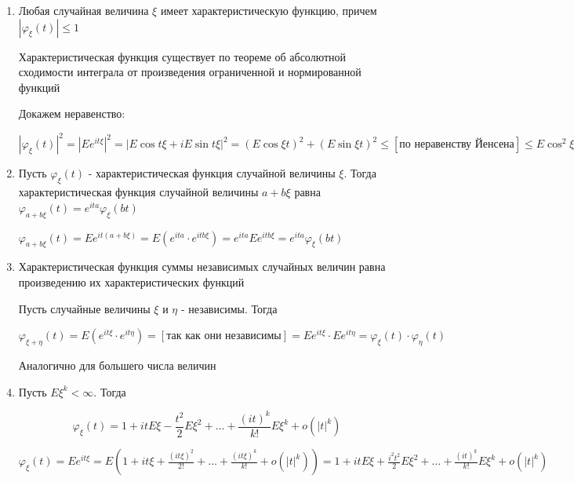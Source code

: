 \documentclass[12pt]{article}
\begin{document}
\begin{enumerate}
    \item Любая случайная величина $\xi$ имеет характеристическую функцию, причем $|\varphi_\xi(t)| \leq 1$

    \begin{MyProof}
        Характеристическая функция существует по теореме об абсолютной сходимости интеграла от произведения ограниченной и 
        нормированной функций

        Докажем неравенство:

        $|\varphi_\xi(t)|^2 = |Ee^{it\xi}|^2 = |E\cos t\xi + iE\sin t\xi|^2 = (E\cos\xi t)^2 + (E \sin\xi t)^2 \leq [\text{по неравенству Йенсена}] \leq
        E\cos^2 \xi t + E\sin^2 \xi t = E(\cos^2 \xi t + \sin^2 \xi t) = E 1 = 1$
    \end{MyProof}

    \item Пусть $\varphi_\xi(t)$ - характеристическая функция случайной величины $\xi$. Тогда характеристическая функция
    случайной величины $a + b\xi$ равна $\varphi_{a + b\xi}(t) = e^{ita} \varphi_{\xi}(bt)$

    \begin{MyProof}
        $\varphi_{a + b\xi}(t) = Ee^{it(a + b\xi)} = E(e^{ita} \cdot e^{itb\xi}) = e^{ita}Ee^{itb\xi} = e^{ita} \varphi_{\xi}(bt)$
    \end{MyProof}

    \item Характеристическая функция суммы независимых случайных величин равна произведению их характеристических функций

    \begin{MyProof}
        Пусть случайные величины $\xi$ и $\eta$ - независимы. Тогда 

        $\varphi_{\xi + \eta}(t) = E(e^{it\xi} \cdot e^{it\eta}) = [\text{так как они независимы}] = Ee^{it\xi} \cdot Ee^{it\eta} = \varphi_\xi(t) \cdot \varphi_\eta(t)$

        Аналогично для большего числа величин
    \end{MyProof}

    \item Пусть $E\xi^k < \infty$. Тогда 

    \[\varphi_\xi(t) = 1 + it E\xi - \frac{t^2}{2}E\xi^2 + \dots + \frac{(it)^k}{k!} E\xi^k + o(|t|^k)\]

    \begin{MyProof}
        $\varphi_\xi(t) = Ee^{it\xi} = E(1 + it\xi + \frac{(it\xi)^2}{2!} + \dots + \frac{(it\xi)^k}{k!} + o(|t|^k)) = 
        1 + it E\xi + \frac{i^2 t^2}{2}E\xi^2 + \dots + \frac{(it)^k}{k!} E\xi^k + o(|t|^k)$
    \end{MyProof}


\end{enumerate}
\end{document}
